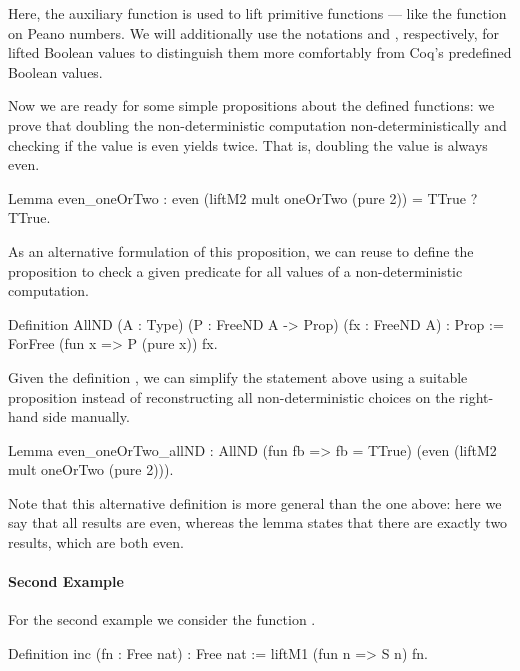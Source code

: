 Here, the auxiliary function  is used to lift primitive functions --- like the  function on Peano numbers.
We will additionally use the notations  and , respectively, for lifted Boolean values to distinguish them more comfortably from Coq's predefined Boolean values.

Now we are ready for some simple propositions about the defined functions: we prove that doubling the non\--deterministic computation  non\--deterministically and checking if the value is even yields  twice.
That is, doubling the value  is always even.

\begin{coqcode}
Lemma even_oneOrTwo : even (liftM2 mult oneOrTwo (pure 2)) = TTrue ? TTrue.
\end{coqcode}

As an alternative formulation of this proposition, we can reuse  to define the proposition  to check a given predicate for all values of a non\--deterministic computation.

\begin{coqcode}
Definition AllND (A : Type) (P : FreeND A -> Prop) (fx : FreeND A) : Prop :=
  ForFree (fun x => P (pure x)) fx.
\end{coqcode}

Given the definition , we can simplify the statement above using a suitable proposition instead of reconstructing all non\--deterministic choices on the right\--hand side manually.

\begin{coqcode}
Lemma even_oneOrTwo_allND :
  AllND (fun fb => fb = TTrue) (even (liftM2 mult oneOrTwo (pure 2))).
\end{coqcode}

Note that this alternative definition is more general than the one above: here we say that all results are even, whereas the lemma  states that there are exactly two results, which are both even.

\paragraph{Second Example}
For the second example we consider the function .

\begin{coqcode}
Definition inc (fn : Free nat) : Free nat :=
  liftM1 (fun n => S n) fn.
\end{coqcode}

